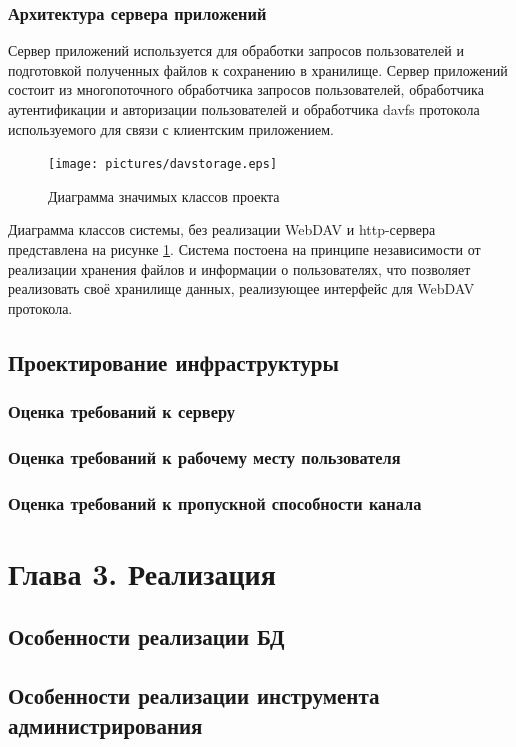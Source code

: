 \documentclass[utf8,usehyperref,12pt]{G7-32}
\begin{document}
\subsection{Архитектура сервера приложений}

Сервер приложений используется для обработки запросов пользователей и подготовкой полученных файлов к сохранению в хранилище. Сервер приложений состоит из многопоточного обработчика запросов пользователей, обработчика аутентификации и авторизации пользователей и обработчика davfs протокола используемого для связи с клиентским приложением.

\begin{figure}[ht]
   \centering%
   \texttt{[image: pictures/davstorage.eps]}
   \caption{Диаграмма значимых классов проекта}\label{fig:davstorage}
 \end{figure}
 
 Диаграмма классов системы, без реализации WebDAV и http-сервера представлена на рисунке \ref{fig:davstorage}. Система постоена на принципе независимости от реализации хранения файлов и информации о пользователях, что позволяет реализовать своё хранилище данных, реализующее интерфейс для WebDAV протокола.

\section{Проектирование инфраструктуры}
\subsection{Оценка требований к серверу}
\subsection{Оценка требований к рабочему месту пользователя}
\subsection{Оценка требований к пропускной способности канала}

\chapter{Глава 3. Реализация}
\section{Особенности реализации БД}
\section{Особенности реализации инструмента администрирования}
\end{document}
